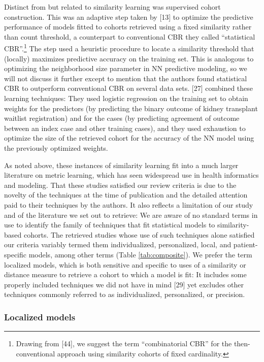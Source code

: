 \documentclass[preprint, 3p,
authoryear]{elsarticle} %
\begin{document}
Distinct from but related to similarity learning was supervised cohort
construction. This was an adaptive step taken by {[}13{]} to optimize
the predictive performance of models fitted to cohorts retrieved using a
fixed similarity rather than count threshold, a counterpart to
conventional CBR they called ``statistical CBR''.\footnote{Drawing from
  {[}44{]}, we suggest the term ``combinatorial CBR'' for the
  then-conventional approach using similarity cohorts of fixed
  cardinality.} The step used a heuristic procedure to locate a
similarity threshold that (locally) maximizes predictive accuracy on the
training set. This is analogous to optimizing the neighborhood size
parameter in NN predictive modeling, so we will not discuss it further
except to mention that the authors found statistical CBR to outperform
conventional CBR on several data sets. {[}27{]} combined these learning
techniques: They used logistic regression on the training set to obtain
weights for the predictors (by predicting the binary outcome of kidney
transplant waitlist registration) and for the cases (by predicting
agreement of outcome between an index case and other training cases),
and they used exhaustion to optimize the size of the retrieved cohort
for the accuracy of the NN model using the previously optimized weights.

As noted above, these instances of similarity learning fit into a much
larger literature on metric learning, which has seen widespread use in
health informatics and modeling. That these studies satisfied our review
criteria is due to the novelty of the techniques at the time of
publication and the detailed attention paid to their techniques by the
authors. It also reflects a limitation of our study and of the
literature we set out to retrieve: We are aware of no standard terms in
use to identify the family of techniques that fit statistical models to
similarity-based cohorts. The retrieved studies whose use of such
techniques alone satisfied our criteria variably termed them
individualized, personalized, local, and patient-specific models, among
other terms (Table \ref{tab:composite}). We prefer the term localized
models, which is both sensitive and specific to uses of a similarity or
distance measure to retrieve a cohort to which a model is fit: It
includes some properly included techniques we did not have in mind
{[}29{]} yet excludes other techniques commonly referred to as
individualized, personalized, or precision.

\hypertarget{localized-models}{%
\subsubsection{Localized models}\label{localized-models}}
\end{document}
